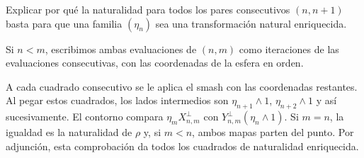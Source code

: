 \begin{ejer}\label{ejer:c26-naturaleza-consecutiva}
Explicar por qué la naturalidad para todos los pares consecutivos $(n,n+1)$ basta para que una familia $(\eta_n)$ sea una transformación natural enriquecida.
\end{ejer}
\begin{sol}
Si $n<m$, escribimos ambas evaluaciones de $(n,m)$ como iteraciones de las evaluaciones consecutivas, con las coordenadas de la esfera en orden.

A cada cuadrado consecutivo se le aplica el smash con las coordenadas restantes. Al pegar estos cuadrados, los lados intermedios son $\eta_{n+1}\wedge1$, $\eta_{n+2}\wedge1$ y así sucesivamente. El contorno compara $\eta_mX_{n,m}^{\perp}$ con $Y_{n,m}^{\perp}(\eta_n\wedge1)$. Si $m=n$, la igualdad es la naturalidad de $\rho$ y, si $m<n$, ambos mapas parten del punto. Por adjunción, esta comprobación da todos los cuadrados de naturalidad enriquecida.
\end{sol}


